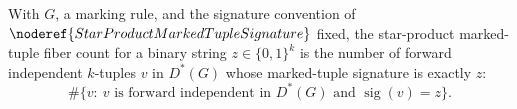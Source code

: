 \begin{definition}
With \(G\), a marking rule, and the signature convention of
\(\noderef{StarProductMarkedTupleSignature}\) fixed, the star-product
marked-tuple fiber count for a binary string \(z\in\{0,1\}^k\) is the number
of forward independent \(k\)-tuples \(v\) in \(D^*(G)\) whose marked-tuple
signature is exactly \(z\):
\[
  \#\{v:\ v\text{ is forward independent in }D^*(G)
        \text{ and }\operatorname{sig}(v)=z\}.
\]
\end{definition}
